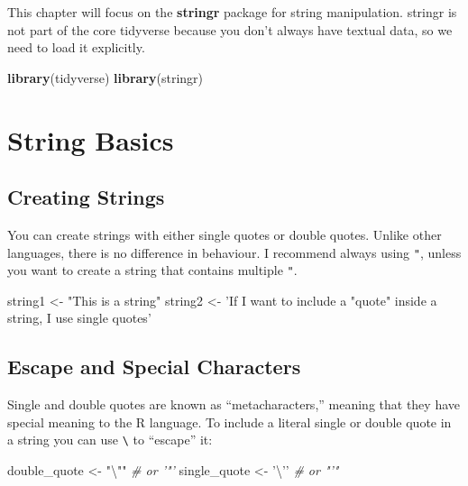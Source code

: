 \documentclass[]{book}
\newenvironment{Shaded}{\begin{snugshade}}{\end{snugshade}}
\newcommand{\CharTok}[1]{\textcolor[rgb]{0.31,0.60,0.02}{#1}}
\newcommand{\CommentTok}[1]{\textcolor[rgb]{0.56,0.35,0.01}{\textit{#1}}}
\newcommand{\KeywordTok}[1]{\textcolor[rgb]{0.13,0.29,0.53}{\textbf{#1}}}
\newcommand{\NormalTok}[1]{#1}
\newcommand{\StringTok}[1]{\textcolor[rgb]{0.31,0.60,0.02}{#1}}
\begin{document}
This chapter will focus on the \textbf{stringr} package for string manipulation. stringr is not part of the core tidyverse because you don't always have textual data, so we need to load it explicitly.

\begin{Shaded}
\begin{Highlighting}[]
\KeywordTok{library}\NormalTok{(tidyverse)}
\KeywordTok{library}\NormalTok{(stringr)}
\end{Highlighting}
\end{Shaded}

\hypertarget{string-basics}{%
\section{String Basics}\label{string-basics}}

\hypertarget{creating-strings}{%
\subsection{Creating Strings}\label{creating-strings}}

You can create strings with either single quotes or double quotes. Unlike other languages, there is no difference in behaviour. I recommend always using \texttt{"}, unless you want to create a string that contains multiple \texttt{"}.

\begin{Shaded}
\begin{Highlighting}[]
\NormalTok{string1 <-}\StringTok{ "This is a string"}
\NormalTok{string2 <-}\StringTok{ 'If I want to include a "quote" inside a string, I use single quotes'}
\end{Highlighting}
\end{Shaded}

\hypertarget{escape-and-special-characters}{%
\subsection{Escape and Special Characters}\label{escape-and-special-characters}}

Single and double quotes are known as ``metacharacters,'' meaning that they have special meaning to the R language. To include a literal single or double quote in a string you can use \texttt{\textbackslash{}} to ``escape'' it:

\begin{Shaded}
\begin{Highlighting}[]
\NormalTok{double_quote <-}\StringTok{ "}\CharTok{\textbackslash{}"}\StringTok{"} \CommentTok{# or '"'}
\NormalTok{single_quote <-}\StringTok{ '}\CharTok{\textbackslash{}'}\StringTok{'} \CommentTok{# or "'"}
\end{Highlighting}
\end{Shaded}
\end{document}
